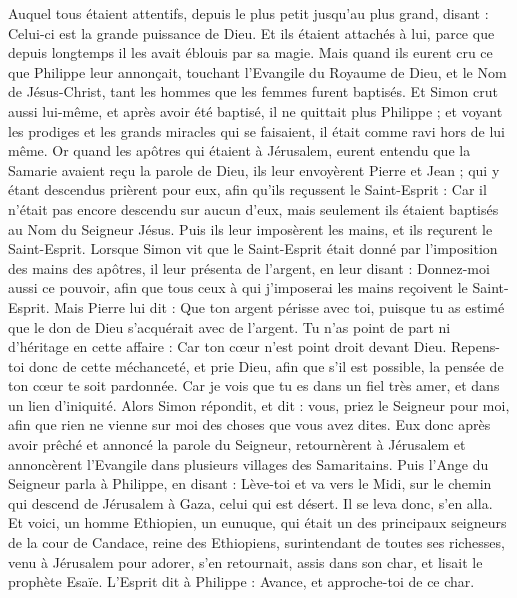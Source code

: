 \begin{multicols}{2}
{Auquel tous étaient attentifs, depuis le plus petit jusqu'au plus grand, disant : Celui-ci est la grande puissance de Dieu.
Et ils étaient attachés à lui, parce que depuis longtemps il les avait éblouis par sa magie.
Mais quand ils eurent cru ce que Philippe leur annonçait, touchant l'Evangile du Royaume de Dieu, et le Nom de Jésus-Christ, tant les hommes que les femmes furent baptisés.
Et Simon crut aussi lui-même, et après avoir été baptisé, il ne quittait plus Philippe ; et voyant les prodiges et les grands miracles qui se faisaient, il était comme ravi hors de lui même.
Or quand les apôtres qui étaient à Jérusalem, eurent entendu que la Samarie avaient reçu la parole de Dieu, ils leur envoyèrent Pierre et Jean ;
qui y étant descendus prièrent pour eux, afin qu'ils reçussent le Saint-Esprit :
Car il n'était pas encore descendu sur aucun d'eux, mais seulement ils étaient baptisés au Nom du Seigneur Jésus.
Puis ils leur imposèrent les mains, et ils reçurent le Saint-Esprit.
Lorsque Simon vit que le Saint-Esprit était donné par l'imposition des mains des apôtres, il leur présenta de l'argent,
en leur disant : Donnez-moi aussi ce pouvoir, afin que tous ceux à qui j'imposerai les mains reçoivent le Saint-Esprit.
Mais Pierre lui dit : Que ton argent périsse avec toi, puisque tu as estimé que le don de Dieu s'acquérait avec de l'argent.
Tu n'as point de part ni d'héritage en cette affaire : Car ton cœur n'est point droit devant Dieu.
Repens-toi donc de cette méchanceté, et prie Dieu, afin que s'il est possible, la pensée de ton cœur te soit pardonnée.
Car je vois que tu es dans un fiel très amer, et dans un lien d'iniquité.
Alors Simon répondit, et dit : vous, priez le Seigneur pour moi, afin que rien ne vienne sur moi des choses que vous avez dites.
Eux donc après avoir prêché et annoncé la parole du Seigneur, retournèrent à Jérusalem et annoncèrent l'Evangile dans plusieurs villages des Samaritains.
Puis l'Ange du Seigneur parla à Philippe, en disant : Lève-toi et va vers le Midi, sur le chemin qui descend de Jérusalem à Gaza, celui qui est désert.
Il se leva donc, s'en alla. Et voici, un homme Ethiopien, un eunuque, qui était un des principaux seigneurs de la cour de Candace, reine des Ethiopiens, surintendant de toutes ses richesses, venu à Jérusalem pour adorer,
s'en retournait, assis dans son char, et lisait le prophète Esaïe.
L'Esprit dit à Philippe : Avance, et approche-toi de ce char.
}
\end{multicols}
